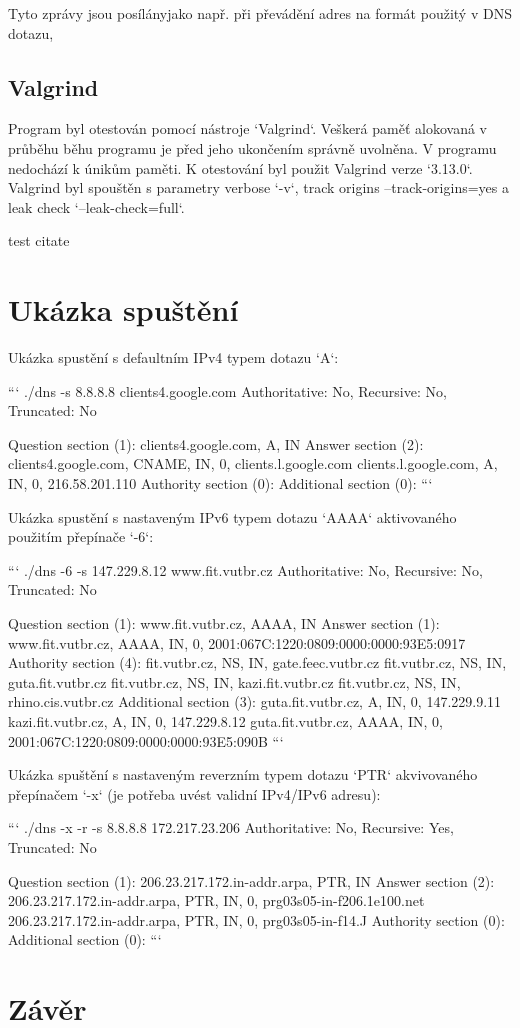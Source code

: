 \documentclass[a4paper,11pt]{article}
\begin{document}
Tyto zprávy jsou posílányjako např. při převádění adres na formát použitý v DNS dotazu, 

\subsection{Valgrind}

Program byl otestován pomocí nástroje `Valgrind`. Veškerá paměť alokovaná v průběhu běhu programu je před jeho ukončením správně uvolněna. V programu nedochází k únikům paměti. K otestování byl použit Valgrind verze `3.13.0`. Valgrind byl spouštěn s parametry verbose `-v`, track origins --track-origins=yes a leak check `--leak-check=full`.

test citate \cite{test_citate}

\section{Ukázka spuštění}

Ukázka spustění s defaultním IPv4 typem dotazu `A`:

```
./dns -s 8.8.8.8 clients4.google.com
Authoritative: No, Recursive: No, Truncated: No

Question section (1):
  clients4.google.com, A, IN
Answer section (2):
  clients4.google.com, CNAME, IN, 0, clients.l.google.com
  clients.l.google.com, A, IN, 0, 216.58.201.110
Authority section (0):
Additional section (0):
```

Ukázka spustění s nastaveným IPv6 typem dotazu `AAAA` aktivovaného použitím přepínače `-6`:

```
./dns -6 -s 147.229.8.12 www.fit.vutbr.cz
Authoritative: No, Recursive: No, Truncated: No

Question section (1):
  www.fit.vutbr.cz, AAAA, IN
Answer section (1):
  www.fit.vutbr.cz, AAAA, IN, 0, 2001:067C:1220:0809:0000:0000:93E5:0917
Authority section (4):
  fit.vutbr.cz, NS, IN, gate.feec.vutbr.cz
  fit.vutbr.cz, NS, IN, guta.fit.vutbr.cz
  fit.vutbr.cz, NS, IN, kazi.fit.vutbr.cz
  fit.vutbr.cz, NS, IN, rhino.cis.vutbr.cz
Additional section (3):
  guta.fit.vutbr.cz, A, IN, 0, 147.229.9.11
  kazi.fit.vutbr.cz, A, IN, 0, 147.229.8.12
  guta.fit.vutbr.cz, AAAA, IN, 0, 2001:067C:1220:0809:0000:0000:93E5:090B
```

Ukázka spuštění s nastaveným reverzním typem dotazu `PTR` akvivovaného přepínačem `-x` (je potřeba uvést validní IPv4/IPv6 adresu):

```
./dns -x -r -s 8.8.8.8 172.217.23.206
Authoritative: No, Recursive: Yes, Truncated: No

Question section (1):
  206.23.217.172.in-addr.arpa, PTR, IN
Answer section (2):
  206.23.217.172.in-addr.arpa, PTR, IN, 0, prg03s05-in-f206.1e100.net
  206.23.217.172.in-addr.arpa, PTR, IN, 0, prg03s05-in-f14.J
Authority section (0):
Additional section (0):
```

\section{Závěr}


\newpage




\end{document}
